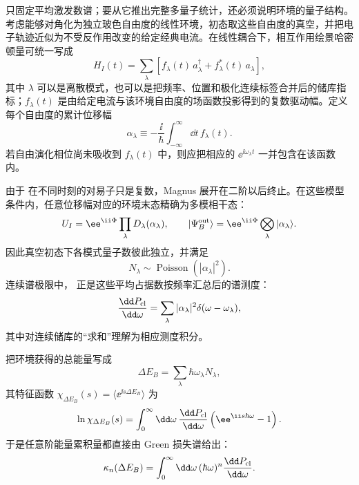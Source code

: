  只固定平均激发数谱；要从它推出完整多量子统计，还必须说明环境的量子结构。考虑能够对角化为独立玻色自由度的线性环境，初态取这些自由度的真空，并把电子轨迹近似为不受反作用改变的给定经典电流。在线性耦合下，相互作用绘景哈密顿量可统一写成
\begin{equation}
 {
 H_I(t)
 =\sum_\lambda
 \left[f_\lambda(t)\,a_\lambda^\dagger
 +f_\lambda^*(t)\,a_\lambda\right],}
 \label{eq:prescribed-current-linear-bath-hamiltonian-dp85}
\end{equation}
其中 $\lambda$ 可以是离散模式，也可以是把频率、位置和极化连续标签合并后的储库指标；$f_\lambda(t)$ 是由给定电流与该环境自由度的场函数投影得到的复数驱动幅。定义每个自由度的累计位移幅
\begin{equation}
 {
 \alpha_\lambda
 \equiv-\frac{\ii}{\hbar}
 \int_{-\infty}^{\infty}\dd t\,f_\lambda(t).}
 \label{eq:prescribed-current-mode-displacement-dp85}
\end{equation}
若自由演化相位尚未吸收到 $f_\lambda(t)$ 中，则应把相应的 $\ee^{\ii\omega_\lambda t}$ 一并包含在该函数内。

由于 在不同时刻的对易子只是复数，Magnus 展开在二阶以后终止。在这些模型条件内，任意位移幅对应的环境末态精确为多模相干态：
\begin{equation}
 {
 U_I=\ee^{\ii\Phi}\prod_\lambda D_\lambda(\alpha_\lambda),
 \qquad
 |\Psi_B^{\rm out}\rangle
 =\ee^{\ii\Phi}\bigotimes_\lambda|\alpha_\lambda\rangle.}
 \label{eq:prescribed-current-multimode-coherent-state-dp85}
\end{equation}
因此真空初态下各模式量子数彼此独立，并满足
\begin{equation*}
 N_\lambda\sim\operatorname{Poisson}(|\alpha_\lambda|^2).
\end{equation*}
连续谱极限中， 正是这些平均占据数按频率汇总后的谱测度：
\begin{equation}
 {
 \frac{\dd P_{\rm cl}}{\dd\omega}
 =\sum_\lambda|\alpha_\lambda|^2
 \delta(\omega-\omega_\lambda),}
 \label{eq:green-loss-spectrum-mode-measure-dp85}
\end{equation}
其中对连续储库的“求和”理解为相应测度积分。

把环境获得的总能量写成
\begin{equation*}
 \Delta E_B=\sum_\lambda\hbar\omega_\lambda N_\lambda,
\end{equation*}
其特征函数 $\chi_{\Delta E_B}(s)=\langle \ee^{\ii s\Delta E_B}\rangle$ 为
\begin{equation}
 {
 \ln\chi_{\Delta E_B}(s)
 =\int_0^\infty\dd\omega\,
 \frac{\dd P_{\rm cl}}{\dd\omega}
 \left(\ee^{\ii s\hbar\omega}-1\right).}
 \label{eq:green-loss-compound-poisson-cgf-dp84}
\end{equation}
于是任意阶能量累积量都直接由 Green 损失谱给出：
\begin{equation}
 {
 \kappa_n(\Delta E_B)
 =\int_0^\infty\dd\omega\,
 (\hbar\omega)^n
 \frac{\dd P_{\rm cl}}{\dd\omega}.}
 \label{eq:green-loss-cumulants-dp84}
\end{equation}

